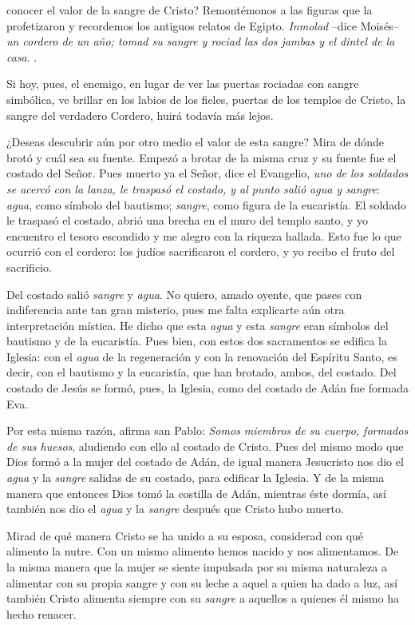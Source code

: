 \begin{body}
 conocer el valor de la sangre de Cristo? Remontémonos a las figuras que la profetizaron y recordemos los antiguos relatos de Egipto. \textit{Inmolad} –dice Moisés– \textit{un cordero de un año; tomad su sangre y rociad las dos jambas y el dintel de la casa}.  .

Si hoy, pues, el enemigo, en lugar de ver las puertas rociadas con sangre simbólica, ve brillar en los labios de los fieles, puertas de los templos de Cristo, la sangre del verdadero Cordero, huirá todavía más lejos.

¿Deseas descubrir aún por otro medio el valor de esta sangre? Mira de dónde brotó y cuál sea su fuente. Empezó a brotar de la misma cruz y su fuente fue el costado del Señor. Pues muerto ya el Señor, dice el Evangelio, \textit{uno de los soldados se acercó con la lanza, le traspasó el costado, y al punto salió agua y sangre}: \textit{agua}, como símbolo del bautismo; \textit{sangre}, como figura de la eucaristía. El soldado le traspasó el costado, abrió una brecha en el muro del templo santo, y yo encuentro el tesoro escondido y me alegro con la riqueza hallada. Esto fue lo que ocurrió con el cordero: los judíos sacrificaron el cordero, y yo recibo el fruto del sacrificio.

Del costado salió \textit{sangre} y \textit{agua}. No quiero, amado oyente, que pases con indiferencia ante tan gran misterio, pues me falta explicarte aún otra interpretación mística. He dicho que esta \textit{agua} y esta \textit{sangre} eran símbolos del bautismo y de la eucaristía. Pues bien, con estos dos sacramentos se edifica la Iglesia: con el \textit{agua} de la regeneración y con la renovación del Espíritu Santo, es decir, con el bautismo y la eucaristía, que han brotado, ambos, del costado. Del costado de Jesús se formó, pues, la Iglesia, como del costado de Adán fue formada Eva.


\newpage 
Por esta misma razón, afirma san Pablo: \textit{Somos miembros de su cuerpo, formados de sus huesos}, aludiendo con ello al costado de Cristo. Pues del mismo modo que Dios formó a la mujer del costado de Adán, de igual manera Jesucristo nos dio el \textit{agua} y la \textit{sangre} salidas de su costado, para edificar la Iglesia. Y de la misma manera que entonces Dios tomó la costilla de Adán, mientras éste dormía, así también nos dio el \textit{agua} y la \textit{sangre} después que Cristo hubo muerto.

Mirad de qué manera Cristo se ha unido a su esposa, considerad con qué alimento la nutre. Con un mismo alimento hemos nacido y nos alimentamos. De la misma manera que la mujer se siente impulsada por su misma naturaleza a alimentar con su propia sangre y con su leche a aquel a quien ha dado a luz, así también Cristo alimenta siempre con su \textit{sangre} a aquellos a quienes él mismo ha hecho renacer.
\end{body}

